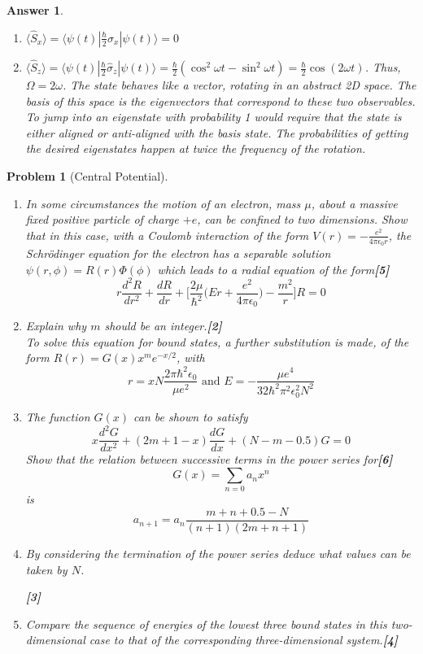 \documentclass[a4paper]{article}
\newtheorem{ans}{Answer}[subsection]
\theoremstyle{new}
\newtheorem{qns}{Problem}[subsection]
\begin{document}
\begin{ans}
\begin{enumerate}[label=(\roman*)]
\begin{enumerate}[label=(\alph*)]
\item $\langle\hat{S}_x\rangle=\langle\psi(t)|\frac{\hbar}{2}\hat{\sigma}_x|\psi(t)\rangle=0$
\item $\langle\hat{S}_z\rangle=\langle\psi(t)|\frac{\hbar}{2}\hat{\sigma}_z|\psi(t)\rangle=\frac{\hbar}{2}(\cos^2\omega t-\sin^2\omega t)=\frac{\hbar}{2}\cos(2\omega t)$. Thus, $\Omega=2\omega$. The state behaves like a vector, rotating in an abstract 2D space. The basis of this space is the eigenvectors that correspond to these two observables. To jump into an eigenstate with probability 1 would require that the state is either aligned or anti-aligned with the basis state. The probabilities of getting the desired eigenstates happen at twice the frequency of the rotation.
\end{enumerate}
\end{enumerate}
\end{ans}
\newpage
\begin{qns}[Central Potential]\leavevmode
\begin{enumerate}[label=(\roman*)]
\item In some circumstances the motion of an electron, mass $\mu$, about a massive fixed positive particle of charge $+e$, can be confined to two dimensions. Show that in this case, with a Coulomb interaction of the form $V(r)=-\frac{e^2}{4\pi\epsilon_0r}$, the Schrödinger equation for the electron has a separable solution $\psi(r,\phi)=R(r)\Phi(\phi)$ which leads to a radial equation of the form\hfill\textbf{[5]}
$$r\frac{d^2R}{dr^2}+\frac{dR}{dr}+\bigg[\frac{2\mu}{\hbar^2}\bigg(Er+\frac{e^2}{4\pi\epsilon_0}\bigg)-\frac{m^2}{r}\bigg]R=0$$
\item Explain why $m$ should be an integer.\hfill\textbf{[2]}\\[5pt]
To solve this equation for bound states, a further substitution is made, of the form $R(r) = G(x)x^me^{−x/2}$, with
$$r=xN\frac{2\pi\hbar^2\epsilon_0}{\mu e^2}\text{  and   }E=-\frac{\mu e^4}{32\hbar^2\pi^2\epsilon_0^2N^2}$$
\item The function $G(x)$ can be shown to satisfy
$$x\frac{d^2G}{dx^2}+(2m+1-x)\frac{dG}{dx}+(N-m-0.5)G=0$$
Show that the relation between successive terms in the power series for\hfill\textbf{[6]}
$$G(x)=\sum_{n=0}a_nx^n$$
is
$$a_{n+1}=a_n\frac{m+n+0.5-N}{(n+1)(2m+n+1)}$$
\item By considering the termination of the power series deduce what values can be taken by $N$.

\hfill\textbf{[3]}
\item Compare the sequence of energies of the lowest three bound states in this two-dimensional case to that of the corresponding three-dimensional system.\hfill\textbf{[4]}
\end{enumerate}
\begin{mdframed}
\end{mdframed}
\end{qns}
\end{document}
